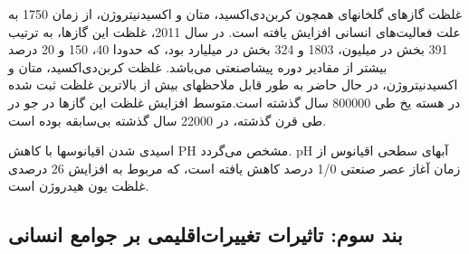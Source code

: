 \begin{enumerate}
		غلظت گاز‌های گلخانهای همچون کربن‌دی‌اکسید، متان و اکسید‌نیتروژن، از زمان 1750 به علت فعالیت‌های انسانی افزایش یافته است. در سال 2011، غلظت این گاز‌ها، به ترتیب 391 بخش در میلیون، 1803 و 324 بخش در میلیارد بود، که حدودا 40، 150 و 20 درصد بیشتر از مقادیر دوره پیشاصنعتی می‌باشد. غلظت کربن‌دی‌اکسید، متان و اکسید‌نیتروژن، در حال حاضر به طور قابل ملاحظهای بیش از بالاترین غلظت ثبت شده در هسته یخ طی 800000 سال گذشته است.متوسط افزایش غلظت این گاز‌ها در جو در طی قرن گذشته، در 22000 سال گذشته بی‌سابقه بوده است.
		
		اسیدی شدن اقیانوسها با کاهش 
		PH مشخص می‌گردد. pH آبهای سطحی اقیانوس از زمان آغاز عصر صنعتی 1/0 درصد کاهش یافته است، که مربوط به افزایش 26 درصدی غلظت یون هیدروژن است.
	\end{enumerate}
	
	
	
	\subsection*{بند سوم: تاثیرات تغییرات‌اقلیمی بر جوامع انسانی}
	
		
		
